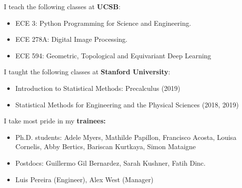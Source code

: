 I teach the following classes at \textbf{UCSB}:
\vspace{-2mm}
\begin{itemize}[leftmargin=*,itemsep=0.2em,topsep=0.2em,parsep=0pt,partopsep=0pt]
    \item ECE 3: Python Programming for Science and Engineering.
    \item ECE 278A: Digital Image Processing.
    \item ECE 594: Geometric, Topological and Equivariant Deep Learning
\end{itemize}

I taught the following classes at \textbf{Stanford University}:
\vspace{-2mm}

\begin{itemize}[leftmargin=*,itemsep=0.2em,topsep=0.2em,parsep=0pt,partopsep=0pt]
    \item Introduction to Statistical Methods: Precalculus (2019)
    \item Statistical Methods for Engineering and the Physical Sciences (2018, 2019)
\end{itemize}

I take most pride in my \textbf{trainees:}
\vspace{-2mm}
\begin{itemize}[leftmargin=*,itemsep=0.2em,topsep=0.2em,parsep=0pt,partopsep=0pt]
    \item Ph.D. students: Adele Myers, Mathilde Papillon, Francisco Acosta, Louisa Cornelis, Abby Bertics, Bariscan Kurtkaya, Simon Mataigne
    \item Postdocs: Guillermo Gil Bernardez, Sarah Kushner, Fatih Dinc.
    \item Luis Pereira (Engineer), Alex West (Manager)
\end{itemize}
\vspace{2mm}